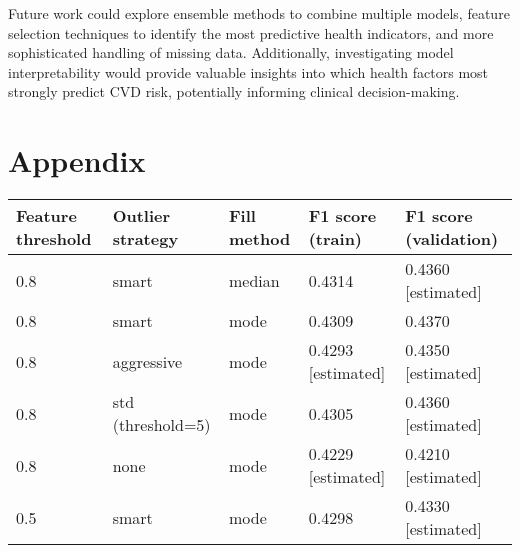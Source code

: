 \documentclass[10pt,conference,compsocconf]{IEEEtran}
\begin{document}
Future work could explore ensemble methods to combine multiple models, feature selection techniques to identify the most predictive health indicators, and more sophisticated handling of missing data. Additionally, investigating model interpretability would provide valuable insights into which health factors most strongly predict CVD risk, potentially informing clinical decision-making.

\clearpage
\section{Appendix}


\vspace{0.3cm}

\vspace{0.5cm}

\noindent\begin{minipage}{\textwidth}
\centering
\begin{tabular}[c]{|l||l|l|l|l|}
  \hline
  Feature threshold & Outlier strategy & Fill method & F1 score (train) & F1 score (validation) \\
  \hline
  0.8 & smart & median & 0.4314 & 0.4360 [estimated]\\ 
  0.8 & smart & mode & 0.4309 & 0.4370 \\ 
  0.8 & aggressive & mode & 0.4293 [estimated] & 0.4350 [estimated] \\ 
  0.8 & std (threshold=5) & mode & 0.4305 & 0.4360 [estimated] \\ 
  0.8 & none & mode & 0.4229 [estimated] & 0.4210 [estimated] \\ 
  0.5 & smart & mode & 0.4298 & 0.4330 [estimated] \\ 
  \hline
\end{tabular}
\label{tab:preprocessing_strategies}
\end{minipage}
\end{document}

